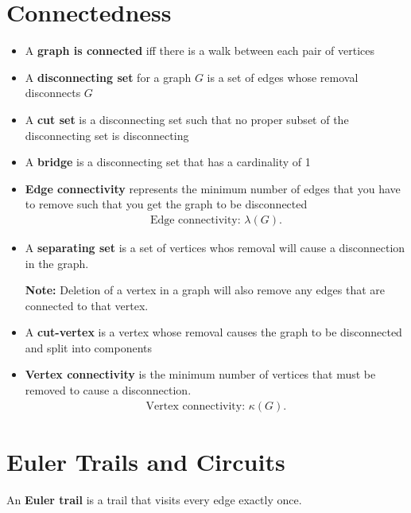 \documentclass{report}
\begin{document}
    \pagebreak \bigbreak \noindent 
    \section{\LARGE Connectedness}
    \bigbreak \noindent 
    \smallbreak \noindent
    \begin{definition}
        \begin{itemize}
            \item A \textbf{graph is connected} iff there is a walk between each pair of vertices
            \item A \textbf{disconnecting set} for a graph $G$ is a set of edges whose removal disconnects $G$  
            \item A \textbf{cut set} is a disconnecting set such that no proper subset of the disconnecting set is disconnecting 
            \item A \textbf{bridge} is a disconnecting set that has a cardinality of 1 
            \item \textbf{Edge connectivity} represents  the minimum number of edges that you have to remove such that you get the graph to be disconnected
            \begin{align*}
                \text{Edge connectivity: } \lambda(G)
            .\end{align*}
        \item A \textbf{separating set} is a set of vertices whos removal will cause a disconnection in the graph. 

            \textbf{Note:} Deletion of a vertex in a graph will also remove any edges that are connected to that vertex. 
        \item A \textbf{cut-vertex} is a vertex whose removal causes the graph to be disconnected and split into components 
        \item \textbf{Vertex connectivity} is the minimum number of vertices that must be removed to cause a disconnection.
            \begin{align*}
                \text{Vertex connectivity: } \kappa(G)
            .\end{align*}
        \end{itemize}
    \end{definition}

    \pagebreak \bigbreak \noindent 
    \section{\LARGE Euler Trails and Circuits}
    \bigbreak \noindent 
    \smallbreak \noindent
    \begin{definition}
        An \textbf{Euler trail} is a trail that visits every edge exactly once.
    \end{definition}





        





    
    
    
    
    
    

     
\end{document}
